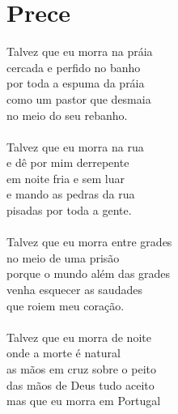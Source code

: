 \documentclass{article}
\begin{document}
\section{ Prece}
Talvez que eu morra na práia\\
cercada e perfido no banho\\
por toda a espuma da práia\\
como um pastor que desmaia\\
no meio do seu rebanho.\\
\\
Talvez que eu morra na rua\\
e dê por mim derrepente\\
em noite fria e sem luar\\
e mando as pedras da rua\\
pisadas por toda a gente.\\
\\
Talvez que eu morra entre grades\\
no meio de uma prisão\\
porque o mundo além das grades\\
venha esquecer as saudades\\
que roiem meu coração.\\
\\
Talvez que eu morra de noite\\
onde a morte é natural\\
as mãos em cruz sobre o peito\\
das mãos de Deus tudo aceito\\
mas que eu morra em Portugal\\
\\
\end{document}
